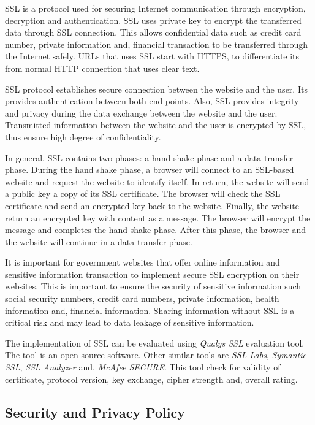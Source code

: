 \documentclass[conference,letterpaper]{IEEEtran}
\begin{document}
SSL is a protocol used for securing Internet communication through
encryption, decryption and authentication\cite{freier2011secure}. SSL
uses private key to encrypt the transferred data through SSL
connection. This allows confidential data such as credit card number,
private information and, financial transaction to be transferred
through the Internet safely. URLs that uses SSL start with HTTPS, to
differentiate its from normal HTTP connection that uses clear text.

SSL protocol establishes secure connection between the website and the
user. Its provides authentication between both end points. Also, SSL
provides integrity and privacy during the data exchange between the
website and the user\cite{alnatheer2014secure}. Transmitted
information between the website and the user is encrypted by SSL, thus
ensure high degree of confidentiality.

In general, SSL contains two phases: a hand shake phase and a data
transfer phase. During the hand shake phase, a browser will connect to
an SSL-based website and request the website to identify itself. In
return, the website will send a public key a copy of its SSL
certificate. The browser will check the SSL certificate and send an
encrypted key back to the website. Finally, the website return an
encrypted key with content as a message.  The browser will encrypt the
message and completes the hand shake phase. After this phase, the
browser and the website will continue in a data transfer phase.

It is important for government websites that offer online information
and sensitive information transaction to implement secure SSL
encryption on their websites. This is important to ensure the security
of sensitive information such social security numbers, credit card
numbers, private information, health information and, financial
information. Sharing information without SSL is a critical risk and
may lead to data leakage of sensitive information.

The implementation of SSL can be evaluated using \emph{Qualys SSL}
evaluation tool. The tool is an open source software. Other similar
tools are \emph{SSL Labs}, \emph{Symantic SSL}, \emph{SSL Analyzer}
and, \emph{McAfee SECURE}. This tool check for validity of
certificate, protocol version, key exchange, cipher strength and,
overall rating.

\subsection{Security and Privacy Policy}
\end{document}
